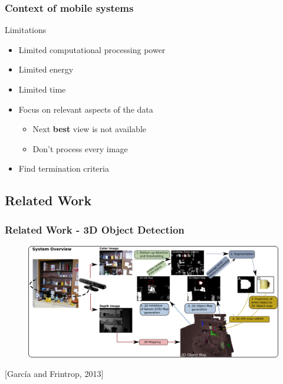 \documentclass[t]{beamer} %
\begin{document}
\begin{frame}
	\frametitle{ Context of mobile systems }
	\begin{block}{Limitations}    
		\begin{itemize}
			\item Limited computational processing power
			\item Limited energy
			\item Limited time
		\end{itemize}
	\end{block}
	\begin{itemize}
		\item Focus on relevant aspects of the data
		\begin{itemize}
			\item Next \textbf{best} view is not available
			\item Don't process every image
		\end{itemize}		
		\item Find termination criteria
	\end{itemize}
\end{frame}

\subsection{Related Work}
\begin{frame}
	\frametitle{ Related Work - 3D Object Detection }
	\begin{figure}[h]
		\includegraphics[width=1\textwidth]{src/frintrop.png}
	\end{figure}
	\centering
	\scriptsize [García and Frintrop, 2013]
\end{frame}
\end{document}
